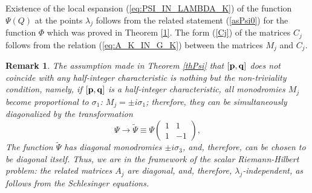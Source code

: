 \documentclass[11pt]{article}
\newtheorem{remark}{Remark}[section]
\def\ben{\begin{displaymath}}
\def\een{\end{displaymath}}
\def\l{\lambda}
\def\Ref{\ref}
\def\pb{{\bf p}}
\def\qb{{\bf q}}
\def\Ref#1{(\ref{#1})}
\begin{document}
Existence of the local espansion \Ref{eq:PSI_IN_LAMBDA_K} of the function $\Psi(Q)$ at the points $\l_j$ follows from the related statement (\ref{asPsi0}) for the function $\Phi$  which was proved  in Theorem \ref{1}. The form (\ref{Cj}) of the matrices $C_j$ follows from the relation 
(\ref{eq:A_K_IN_G_K}) between the matrices $M_j$ and $C_j$.
\begin{remark}\rm
The assumption made in Theorem \ref{thPsi} that $[\pb,\qb]$ does not coincide with any half-integer characteristic is nothing but the non-triviality condition, namely, if $[\pb,\qb]$ is a half-integer  characteristic, 
all monodromies $M_j$ become proportional to $\sigma_1$: $M_j=\pm i\sigma_1$; therefore, they can be simultaneously diagonalized by the transformation 
\ben
\Psi\rightarrow \tilde{\Psi}\equiv\Psi \left(\begin{array}{cc}1 & 1\\
                                     1 & -1 \end{array}\right),
\een
The function $\tilde{\Psi}$ has diagonal monodromies $\pm i \sigma_3$, and, therefore, can be chosen to be diagonal itself. Thus, we are in the framework of the scalar Riemann-Hilbert problem: the related matrices $A_j$ are diagonal, and, therefore, $\l_j$-independent, as follows from the 
Schlesinger equations.
\end{remark}
\end{document}
